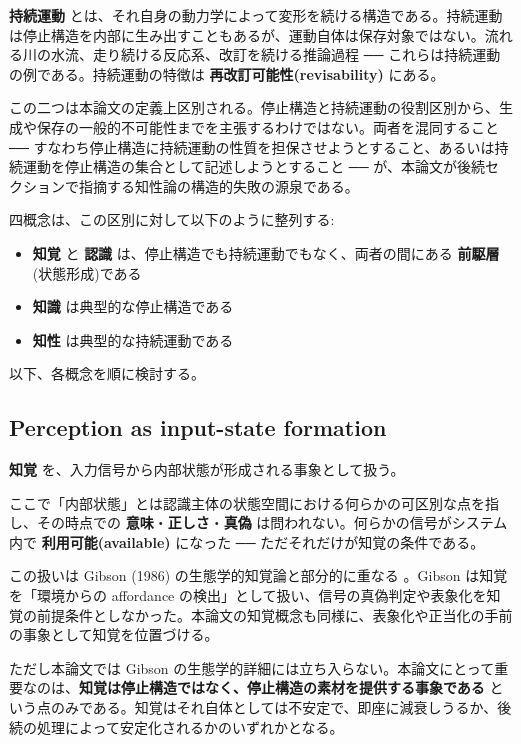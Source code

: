 \textbf{持続運動} とは、それ自身の動力学によって変形を続ける構造である。持続運動は停止構造を内部に生み出すこともあるが、運動自体は保存対象ではない。流れる川の水流、走り続ける反応系、改訂を続ける推論過程 ── これらは持続運動の例である。持続運動の特徴は \textbf{再改訂可能性(revisability)} にある。

この二つは本論文の定義上区別される。停止構造と持続運動の役割区別から、生成や保存の一般的不可能性までを主張するわけではない。両者を混同すること ── すなわち停止構造に持続運動の性質を担保させようとすること、あるいは持続運動を停止構造の集合として記述しようとすること ── が、本論文が後続セクションで指摘する知性論の構造的失敗の源泉である。

四概念は、この区別に対して以下のように整列する:

\begin{itemize}
\item \textbf{知覚} と \textbf{認識} は、停止構造でも持続運動でもなく、両者の間にある \textbf{前駆層}(状態形成)である
\item \textbf{知識} は典型的な停止構造である
\item \textbf{知性} は典型的な持続運動である
\end{itemize}

以下、各概念を順に検討する。

\subsection{Perception as input-state formation}


\textbf{知覚} を、入力信号から内部状態が形成される事象として扱う。

ここで「内部状態」とは認識主体の状態空間における何らかの可区別な点を指し、その時点での \textbf{意味}・\textbf{正しさ}・\textbf{真偽} は問われない。何らかの信号がシステム内で \textbf{利用可能(available)} になった ── ただそれだけが知覚の条件である。

この扱いは Gibson (1986) の生態学的知覚論と部分的に重なる \citep{Gibson1986}。Gibson は知覚を「環境からの affordance の検出」として扱い、信号の真偽判定や表象化を知覚の前提条件としなかった。本論文の知覚概念も同様に、表象化や正当化の手前の事象として知覚を位置づける。

ただし本論文では Gibson の生態学的詳細には立ち入らない。本論文にとって重要なのは、\textbf{知覚は停止構造ではなく、停止構造の素材を提供する事象である} という点のみである。知覚はそれ自体としては不安定で、即座に減衰しうるか、後続の処理によって安定化されるかのいずれかとなる。

